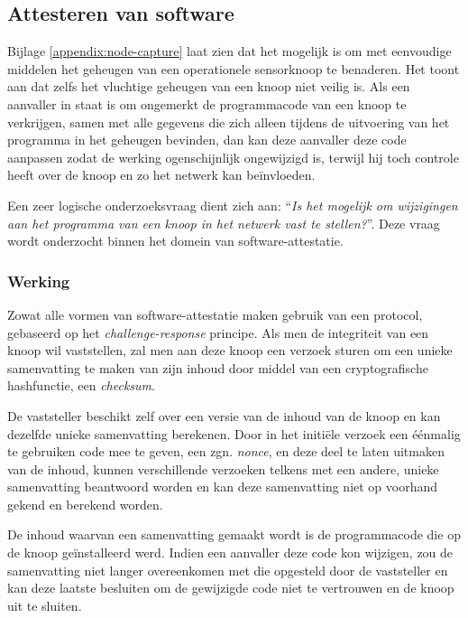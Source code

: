
\subsection{Attesteren van software}
\label{subsection:attestation}

Bijlage \ref{appendix:node-capture} laat zien dat het mogelijk is om met
eenvoudige middelen het geheugen van een operationele sensorknoop te benaderen.
Het toont aan dat zelfs het vluchtige geheugen van een knoop niet veilig is.
Als een aanvaller in staat is om ongemerkt de programmacode van een knoop te
verkrijgen, samen met alle gegevens die zich alleen tijdens de uitvoering van
het programma in het geheugen bevinden, dan kan deze aanvaller deze code
aanpassen zodat de werking ogenschijnlijk ongewijzigd is, terwijl hij toch
controle heeft over de knoop en zo het netwerk kan be\"invloeden.

Een zeer logische onderzoeksvraag dient zich aan: ``\emph{Is het mogelijk om
wijzigingen aan het programma van een knoop in het netwerk vast te stellen?}''.
Deze vraag wordt onderzocht binnen het domein van software-attestatie.

\subsubsection*{Werking}

Zowat alle vormen van software-attestatie maken gebruik van een protocol,
gebaseerd op het \emph{challenge-response} principe. Als men de integriteit van
een knoop wil vaststellen, zal men aan deze knoop een verzoek sturen om een
unieke samenvatting te maken van zijn inhoud door middel van een
cryptografische hashfunctie, een \emph{checksum}.

De vaststeller beschikt zelf over een versie van de inhoud van de knoop en kan
dezelfde unieke samenvatting berekenen. Door in het initi\"ele verzoek een
\'e\'enmalig te gebruiken code mee te geven, een zgn. \emph{nonce}, en deze
deel te laten uitmaken van de inhoud, kunnen verschillende verzoeken telkens
met een andere, unieke samenvatting beantwoord worden en kan deze samenvatting
niet op voorhand gekend en berekend worden.

De inhoud waarvan een samenvatting gemaakt wordt is de programmacode die op de
knoop ge\"installeerd werd. Indien een aanvaller deze code kon wijzigen, zou de
samenvatting niet langer overeenkomen met die opgesteld door de vaststeller en
kan deze laatste besluiten om de gewijzigde code niet te vertrouwen en de knoop
uit te sluiten.


